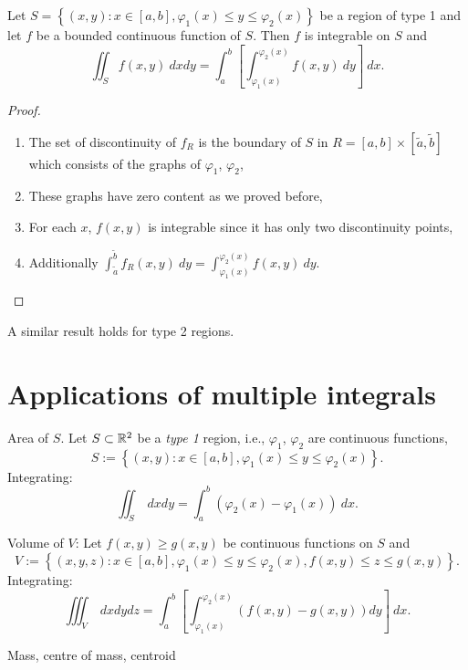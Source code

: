 \begin{theorem}
    Let \(S = \left\{(x,y): x \in [a,b], \varphi_1(x) \leq y \leq \varphi_2(x)\right\}\) be a region of type 1 and let \(f\) be a bounded continuous function of \(S\).
    Then \(f\) is integrable on \(S\) and
    \[
        \iint_{S} f(x,y) \ dxdy = \int_{a}^{b} \left[\int_{\varphi_1(x)}^{\varphi_2(x)} f(x,y) \ dy\right] \ dx.
    \]
\end{theorem}

\begin{proof}
    \begin{enumerate}
        \item The set of discontinuity of \(f_{R}\) is the boundary of \(S\) in \(R=[a,b]\times[\tilde a,\tilde b]\) which consists of the graphs of \(\varphi_1\), \(\varphi_2\),
        \item These graphs have zero content as we proved before,
        \item For each \(x\), \(f(x,y)\) is integrable since it has only two discontinuity points,
        \item Additionally \(\int_{\tilde a}^{\tilde b} f_{R}(x,y) \ dy =  \int_{\varphi_1(x)}^{\varphi_2(x)} f(x,y) \ dy \). \qedhere
    \end{enumerate}
\end{proof}

A similar result holds for type 2 regions.

\section{Applications of multiple integrals}

Area of \(S\).
Let    \(S \subset \mathbb{R}^2\)  be a \emph{type 1} region, i.e.,   \(\varphi_1\), \(\varphi_2\) are continuous functions,
\[
    S := \left\{(x,y): x \in [a,b], \varphi_1(x) \leq y \leq \varphi_2(x)\right\}.
\]
Integrating:
\[
    \iint_{S} \ dx dy = \int_{a}^{b}( \varphi_2(x) - \varphi_1(x)) \ dx.
\]


Volume of \(V\):
Let \(f(x,y) \geq g(x,y)\) be continuous functions on \(S\) and
\[
    V := \left\{ (x,y,z) :  x \in [a,b], \varphi_1(x) \leq y \leq \varphi_2(x), f(x,y) \leq z \leq g(x,y)  \right\}.
\]
Integrating:
\[
    \iiint_{V} \ dxdydz =  \int_{a}^{b}
    \left[ \int_{\varphi_1(x)}^{\varphi_2(x)}   ( f(x,y)  -  g(x,y)) dy \right] \ dx.
\]


{Mass, centre of mass, centroid}


